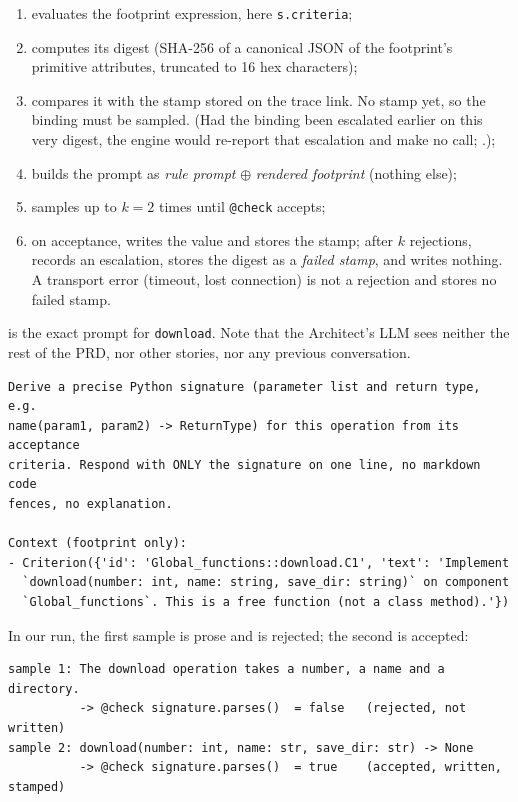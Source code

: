 \documentclass[10pt,a4paper]{article}
\newcommand{\code}[1]{\texttt{#1}}
\theoremstyle{definition}
\begin{document}
\begin{enumerate}[nosep, label=(\alph*)]
\item evaluates the footprint expression, here \code{s.criteria};
\item computes its digest (SHA-256 of a canonical JSON of the footprint's
primitive attributes, truncated to 16 hex characters);
\item compares it with the stamp stored on the trace link. No stamp yet, so
the binding must be sampled. (Had the binding been escalated earlier on this
very digest, the engine would re-report that escalation and make no call;
.);
\item builds the prompt as \emph{rule prompt} $\oplus$ \emph{rendered
footprint} (nothing else);
\item samples up to $k=2$ times until \code{@check} accepts;
\item on acceptance, writes the value and stores the stamp; after $k$
rejections, records an escalation, stores the digest as a \emph{failed
stamp}, and writes nothing. A transport error (timeout, lost connection) is
not a rejection and stores no failed stamp.
\end{enumerate}

 is the exact prompt for \code{download}. Note
that the Architect's LLM sees neither the rest of the PRD, nor other stories,
nor any previous conversation.

\begin{lstlisting}[style=llm, caption={Prompt sent for (\code{op download}, \code{signature}).}, label={lst:prompt-download}]
Derive a precise Python signature (parameter list and return type, e.g.
name(param1, param2) -> ReturnType) for this operation from its acceptance
criteria. Respond with ONLY the signature on one line, no markdown code
fences, no explanation.

Context (footprint only):
- Criterion({'id': 'Global_functions::download.C1', 'text': 'Implement
  `download(number: int, name: string, save_dir: string)` on component
  `Global_functions`. This is a free function (not a class method).'})
\end{lstlisting}

In our run, the first sample is prose and is rejected; the second is
accepted:

\begin{lstlisting}[style=llm, caption={Two samples for (\code{op download}, \code{signature}).}]
sample 1: The download operation takes a number, a name and a directory.
          -> @check signature.parses()  = false   (rejected, not written)
sample 2: download(number: int, name: str, save_dir: str) -> None
          -> @check signature.parses()  = true    (accepted, written, stamped)
\end{lstlisting}
\end{document}
